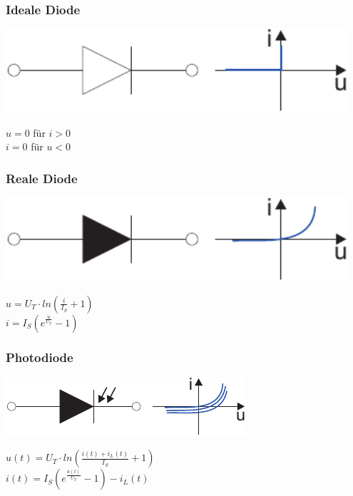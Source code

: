 \documentclass[a4paper,twocolumn,10pt]{article}
\begin{document}
\subsubsection*{Ideale Diode}
\begin{minipage}[b]{0.26\textwidth}
\includegraphics[width=0.95\textwidth]{Grafiken/IdealeDiode}
\end{minipage}
\hfill
\begin{minipage}[b]{0.2\textwidth}
$u=0$ für $i>0$\\
$i=0$ für $u<0$
\end{minipage}

\subsubsection*{Reale Diode}
\begin{minipage}[b]{0.26\textwidth}
\includegraphics[width=0.95\textwidth]{Grafiken/RealeDiode}
\end{minipage}
\hfill
\begin{minipage}[b]{0.2\textwidth}
$u=U_T\cdot ln(\frac{i}{I_S}+1)$\\
$i=I_S(e^{\frac{u}{U_T}}-1)$
\end{minipage}

\subsubsection*{Photodiode}
\begin{minipage}[b]{0.24\textwidth}
\includegraphics[width=\textwidth]{Grafiken/Photodiode}
\end{minipage}
\hfill
\begin{minipage}[b]{0.22\textwidth}
$u(t)=U_T\cdot ln(\frac{i(t)+i_L(t)}{I_S}+1)$\\
$i(t)=I_S(e^{\frac{u(t)}{U_T}}-1)-i_L(t)$
\end{minipage}
\end{document}
